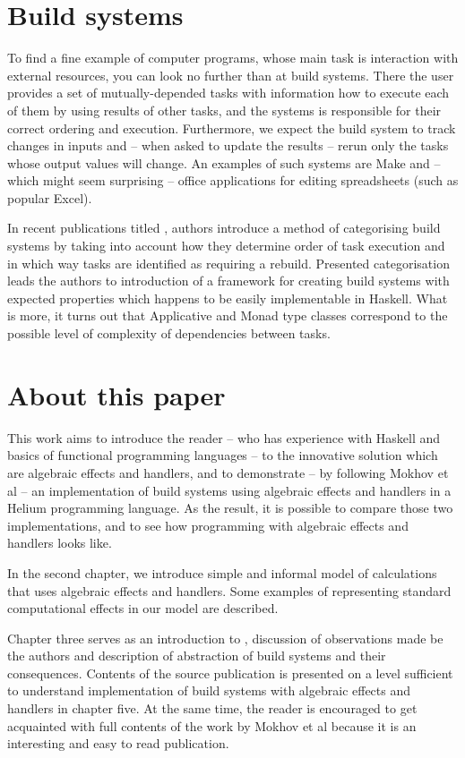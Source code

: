 \section{Build systems}

To find a fine example of computer programs, whose main task is interaction with external resources, you can look no further than at build systems. There the user provides a set of mutually-depended tasks with information how to execute each of them by using results of other tasks, and the systems is responsible for their correct ordering and execution. Furthermore, we expect the build system to track changes in inputs and -- when asked to update the results -- rerun only the tasks whose output values will change. An examples of such systems are Make and -- which might seem surprising -- office applications for editing spreadsheets (such as popular Excel).

In recent publications titled \BSaLC{} \cite{mokhov2018build, mokhov2020build}, authors introduce a method of categorising build systems by taking into account how they determine order of task execution and in which way tasks are identified as requiring a rebuild. Presented categorisation leads the authors to introduction of a framework for creating build systems with expected properties which happens to be easily implementable in Haskell. What is more, it turns out that Applicative and Monad type classes correspond to the possible level of complexity of dependencies between tasks.

\section{About this paper}

This work aims to introduce the reader -- who has experience with Haskell and basics of functional programming languages -- to the innovative solution which are algebraic effects and handlers, and to demonstrate -- by following Mokhov et al -- an implementation of build systems using algebraic effects and handlers in a Helium programming language. As the result, it is possible to compare those two implementations, and to see how programming with algebraic effects and handlers looks like.

In the second chapter, we introduce simple and informal model of calculations that uses algebraic effects and handlers. Some examples of representing standard computational effects in our model are described.

Chapter three serves as an introduction to \BSaLC{}, discussion of observations made be the authors and description of abstraction of build systems and their consequences. Contents of the source publication is presented on a level sufficient to understand implementation of build systems with algebraic effects and handlers in chapter five. At the same time, the reader is encouraged to get acquainted with full contents of the work by Mokhov et al because it is an interesting and easy to read publication.

